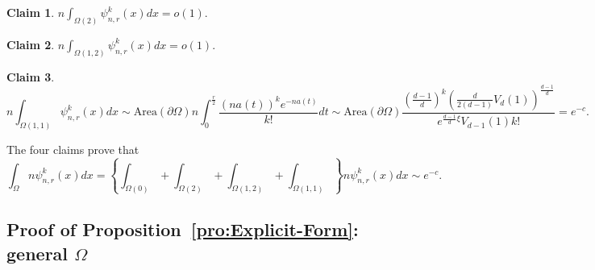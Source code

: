 \documentclass[preprint,12pt]{elsarticle}
\newtheorem{claim}{Claim}
\begin{document}
 \begin{claim}\label{pro:Omega(2)}
$
   n\int_{\Omega(2)} \psi^k_{n,r}(x)dx=o\left(1\right).
$
\end{claim}

\begin{claim}\label{pro:Omega(1,2)}
$
n\int_{\Omega(1,2)} \psi^k_{n,r}(x)dx=o(1).
$
\end{claim}


\begin{claim}\label{pro:Omega(1,1)}
$$
     n\int_{\Omega(1,1)} \psi^k_{n,r}(x)dx\sim \mathrm{Area}(\partial\Omega)
    n\int_0^{\frac r2}\frac{(na(t))^ke^{-na(t)}}{k!}dt
    \sim
   \mathrm{Area}(\partial\Omega)\frac{\left(\frac{d-1}{d}\right)^k\left(\frac{d}{2(d-1)}V_d(1)\right)^{\frac{d-1}{d}}}{e^{\frac{d-1}{d}\xi}{V_{d-1}(1)}k!}=e^{-c}.
$$
\end{claim}
The four claims prove that $$\int_{\Omega}n\psi^k_{n,r}(x)dx=\left\{\int_{\Omega(0)}+\int_{\Omega(2)}+\int_{\Omega(1,2)}+\int_{\Omega(1,1)}\right\}
    n\psi^k_{n,r}(x)dx\sim e^{-c}.$$



\subsection{Proof   of Proposition~\ref{pro:Explicit-Form}: general $\Omega$}
\end{document}
